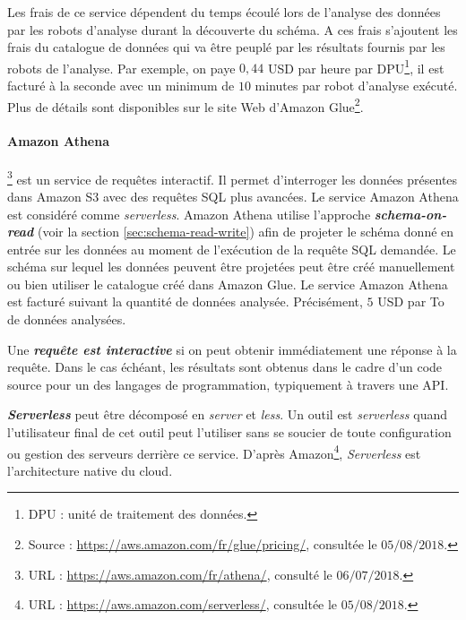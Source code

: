 Les frais de ce service dépendent du temps écoulé lors de l'analyse des données par les robots d'analyse durant la découverte du schéma. A ces frais s'ajoutent les frais du catalogue de données qui va être peuplé par les résultats fournis par les robots de l'analyse. Par exemple, on paye $ 0,44 $ USD par heure par DPU\footnote{DPU : unité de traitement des données.}, il est facturé à la seconde avec un minimum de $ 10 $ minutes par robot d'analyse exécuté. Plus de détails sont disponibles sur le site Web d'Amazon Glue\footnote{Source : \url{https://aws.amazon.com/fr/glue/pricing/}, consultée le $05/08/2018$.}.

\paragraph{Amazon Athena}\label{aws:athena}\footnote{URL : \url{https://aws.amazon.com/fr/athena/}, consulté le $06/07/2018$.} est un service de requêtes  interactif. Il permet d'interroger les données présentes dans Amazon S3 avec des requêtes SQL plus avancées. Le service Amazon Athena est considéré comme \textit{serverless}. Amazon Athena utilise l'approche \textbf{\textit{schema-on-read}} (voir la section \ref{sec:schema-read-write}) afin de projeter le schéma donné en entrée sur les données au moment de l'exécution de la requête SQL demandée. Le schéma sur lequel les données peuvent être projetées peut être créé manuellement ou bien utiliser le catalogue créé dans Amazon Glue.
Le service Amazon Athena est facturé suivant la quantité de données analysée. Précisément, $ 5 $ USD par To de données analysées.


\begin{tcolorbox}
	Une \textbf{\textit{requête est	interactive}} si on peut  obtenir immédiatement une réponse à la requête.  Dans le cas échéant, les résultats sont obtenus  dans le cadre d'un code source pour un des langages de programmation, typiquement à travers une API.
\end{tcolorbox}

\begin{tcolorbox}
	\textbf{\textit{Serverless}} peut être décomposé en \textit{server} et \textit{less}. Un outil est \textit{serverless} quand l'utilisateur final de cet outil peut l'utiliser sans se soucier de toute configuration ou gestion des serveurs derrière ce service. D'après Amazon\footnote{URL : \url{https://aws.amazon.com/serverless/}, consultée le  $05/08/2018$.},  \textit{Serverless} est l'architecture native du cloud.
\end{tcolorbox}

